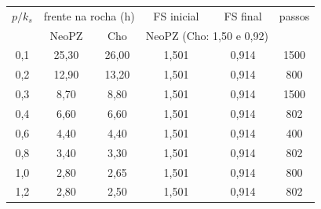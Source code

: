 \begin{tabular}{c|cc|cc|c}
\toprule
$p/k_s$ & \multicolumn{2}{c|}{frente na rocha (h)} & FS inicial & FS final & passos\\
 & NeoPZ & Cho & \multicolumn{2}{c|}{NeoPZ (Cho: 1,50 e 0,92)} & \\
\midrule
0{,}1 & 25{,}30 & 26{,}00 & 1{,}501 & 0{,}914 & 1500\\
0{,}2 & 12{,}90 & 13{,}20 & 1{,}501 & 0{,}914 & 800\\
0{,}3 & 8{,}70 & 8{,}80 & 1{,}501 & 0{,}914 & 1500\\
0{,}4 & 6{,}60 & 6{,}60 & 1{,}501 & 0{,}914 & 802\\
0{,}6 & 4{,}40 & 4{,}40 & 1{,}501 & 0{,}914 & 400\\
0{,}8 & 3{,}40 & 3{,}30 & 1{,}501 & 0{,}914 & 802\\
1{,}0 & 2{,}80 & 2{,}65 & 1{,}501 & 0{,}914 & 800\\
1{,}2 & 2{,}80 & 2{,}50 & 1{,}501 & 0{,}914 & 802\\
\bottomrule
\end{tabular}
